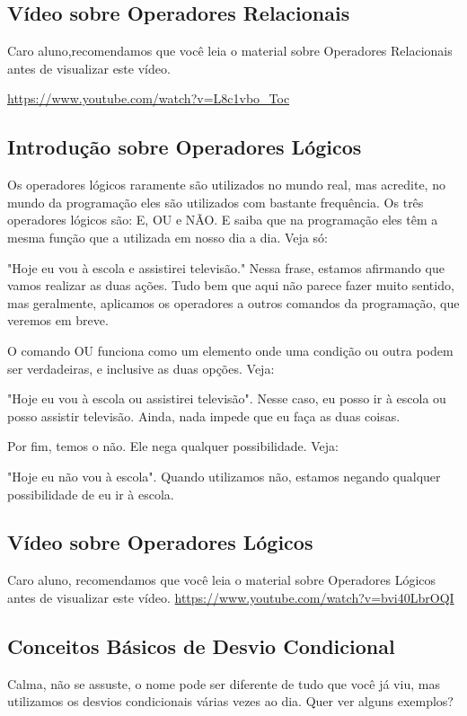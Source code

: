 \documentclass{article}
\begin{document}
\subsection{Vídeo sobre Operadores Relacionais}
Caro aluno,recomendamos que você leia o material sobre Operadores Relacionais antes de visualizar este vídeo.

\href{https://www.youtube.com/watch?v=L8c1vbo_Toc}{https://www.youtube.com/watch?v=L8c1vbo_Toc}

\subsection{Introdução sobre Operadores Lógicos}
Os operadores lógicos raramente são utilizados no mundo real, mas acredite, no mundo da programação eles são utilizados com bastante frequência. Os três operadores lógicos são: E, OU e NÃO. E saiba que na programação eles têm a mesma função que a utilizada em nosso dia a dia. Veja só:

"Hoje eu vou à escola e assistirei televisão." Nessa frase, estamos afirmando que vamos realizar as duas ações. Tudo bem que aqui não parece fazer muito sentido, mas geralmente, aplicamos os operadores a outros comandos da programação, que veremos em breve.

O comando OU funciona como um elemento onde uma condição ou outra podem ser verdadeiras, e inclusive as duas opções. Veja:

"Hoje eu vou à escola ou assistirei televisão". Nesse caso, eu posso ir à escola ou posso assistir televisão. Ainda, nada impede que eu faça as duas coisas.

Por fim, temos o não. Ele nega qualquer possibilidade. Veja:

"Hoje eu não vou à escola". Quando utilizamos não, estamos negando qualquer possibilidade de eu ir à escola.

\subsection{Vídeo sobre Operadores Lógicos}
Caro aluno, recomendamos que você leia o material sobre Operadores Lógicos antes de visualizar este vídeo.
\href{https://www.youtube.com/watch?v=bvi40LbrOQI}{https://www.youtube.com/watch?v=bvi40LbrOQI}

\subsection{Conceitos Básicos de Desvio Condicional}
Calma, não se assuste, o nome pode ser diferente de tudo que você já viu, mas utilizamos os desvios condicionais várias vezes ao dia. Quer ver alguns exemplos?
\end{document}
